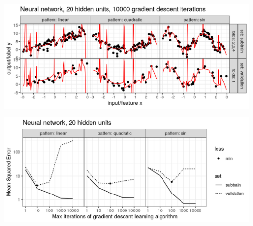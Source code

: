 \begin{frame}
  \includegraphics[width=\textwidth]{figure-overfitting-pred-units=20-maxit=10000.png}
\end{frame}


\begin{frame}
  \includegraphics[width=\textwidth]{figure-overfitting-data-loss-20.png}
\end{frame}

